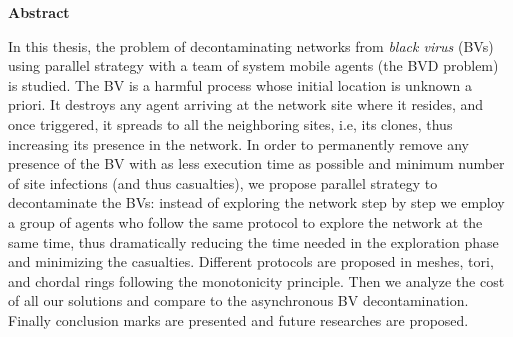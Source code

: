 
\begin{center}\textbf{Abstract}\end{center}



In this thesis, the problem of decontaminating networks from {\em black virus} (BVs) using parallel strategy with a team of system mobile agents (the BVD problem) is studied.
The BV is a harmful process whose initial location is unknown a priori. It destroys any agent arriving at the network site where it resides, and once triggered, it spreads to all the neighboring sites, i.e, its clones, thus increasing its presence in the network. In order to permanently remove any presence of the BV with as less execution time as possible and minimum number of site infections (and thus casualties), we propose parallel strategy to decontaminate the BVs: instead of exploring the network step by step we employ a group of agents who follow the same protocol to explore the network at the same time, thus dramatically reducing the time needed in the exploration phase and minimizing the casualties. Different protocols are proposed in meshes, tori, and chordal rings following the monotonicity principle. Then we analyze the cost of all our solutions and compare to the asynchronous BV decontamination. 
Finally conclusion marks are presented and future researches are proposed.
 

 



\cleardoublepage
